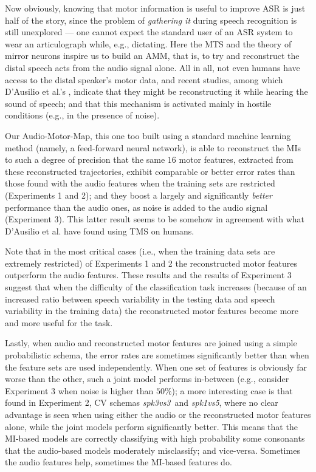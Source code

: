 \documentclass[10pt]{article}
\newcommand{\spkb}{\emph{spk3vs3}}
\newcommand{\spkc}{\emph{spk1vs5}}
\begin{document}
Now obviously, knowing that motor information is useful to improve ASR is just half
of the story, since the problem of \emph{gathering it} during speech recognition is
still unexplored --- one cannot expect the standard user of an ASR system to wear
an articulograph while, e.g., dictating. Here the MTS and the theory of mirror neurons
inspire us to build an AMM, that is, to try and reconstruct the distal speech acts from
the audio signal alone. All in all, not even humans have access to the distal speaker's
motor data, and recent studies, among which D'Ausilio et al.'s \cite{dausilio}, indicate
that they might be reconstructing it while hearing the sound of speech; and that this
mechanism is activated mainly in hostile conditions (e.g., in the presence of noise).

Our Audio-Motor-Map, this one too built using a standard machine learning
method (namely, a feed-forward neural network), is able to reconstruct the MIs
to such a degree of precision that the same $16$ motor features, extracted from these
reconstructed trajectories, exhibit comparable or better error rates than  
those found with the audio features when the training sets are restricted (Experiments 1 and 2);
 and they boost a largely and significantly \emph{better} performance than the audio ones, as
noise is added to the audio signal (Experiment 3). This latter result seems to be
somehow in agreement with what D'Ausilio et al. have found using TMS on humans.

Note that in the most critical cases (i.e., when the training data sets are extremely restricted) of Experiments 1 and 2
the reconstructed motor features outperform the audio features. These results and the results of Experiment 3
suggest that when the difficulty of the classification task increases (because of an increased ratio between speech variability 
in the testing data and speech variability in the training data) the reconstructed 
motor features become more and more useful for the task.

Lastly, when audio and reconstructed motor features are joined using a simple probabilistic schema, the error rates
are sometimes significantly better than when the feature sets are used independently.
When one set of features is obviously far worse than the other, such a joint model performs in-between (e.g., consider
Experiment 3 when noise is higher than $50\%$); a more interesting case is that
found in Experiment 2, CV schemas \spkb\ and \spkc, where no clear advantage is seen
when using either the audio or the reconstructed motor features alone, while
the joint models perform significantly better. This means that the MI-based models are
correctly classifying with high probability some consonants that the audio-based models
moderately misclassify; and vice-versa. Sometimes the audio features help, sometimes the
MI-based features do.
\end{document}
